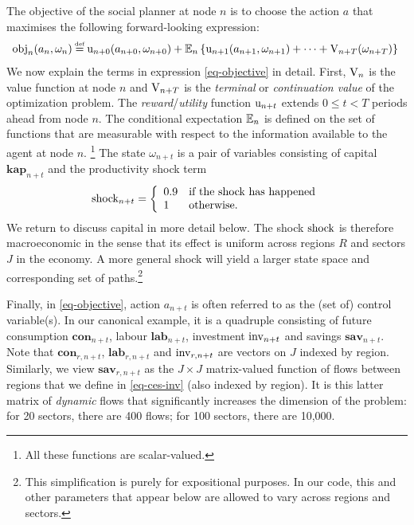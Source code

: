 \documentclass[12pt,a4paper,twoside, draft]{article}
\begin{document}
The objective of the social planner at node $n$ is to choose the action $a$
that maximises the following forward-looking expression:
\begin{align}\label{eq-objective}
\hskip-3pt   \textup{obj}_{n}(a_{n}, \omega_{n}) \defeq
   \textup{u}_{n + 0}(a_{n + 0}, \omega_{n + 0})
    + \mbb{E}_{n}\left\{
      \textup{u}_{n + 1}(a_{n + 1}, \omega_{n + 1}) + \cdots
      + \textup{V}_{n + T}(\omega_{n + T})
    \right\}
\end{align}
We now explain the terms in expression \eqref{eq-objective} in detail.
First, $\textup{V}_{n}$ is the value function at node $n$ and
$\textup{V}_{n + T}$ is the \emph{terminal} or \emph{continuation value} of the
optimization problem.
The \emph{reward}/\emph{utility} function $\textup{u}_{n + t}$ extends
$0 \leq t < T$ periods ahead from node $n$.
The conditional expectation $\mathbb{E}_{n}$ is defined on the set of functions
that are measurable with respect to the information available to the agent at 
node $n$.
\footnote{
   All these functions are scalar-valued.
}
The state $\omega_{n + t} $ is a pair of variables consisting  of capital
$\mathbf{kap}_{n + t}$ and the productivity shock term
\begin{equation}
   \textup{shock}_{n + t} = \left\{
      \begin{array}{ll}
         0.9 & \textup{if the shock has happened}\\
         1 & \textup{otherwise.}
      \end{array}\right.
\end{equation}
We return to discuss capital in more detail below.
The shock $\textup{shock}$ is therefore macroeconomic in the sense that
its effect is uniform across regions $R$ and sectors $J$ in the economy.
A more general shock will yield a larger state space and corresponding set of
paths.\footnote{
   This simplification is purely for expositional purposes.
   In our code, this and other parameters that appear below are allowed to vary 
   across regions and sectors.
}

Finally, in \eqref{eq-objective}, action $a_{n + t}$ is often referred to as
the (set of) control variable(s).
In our canonical example, it is a quadruple consisting of future consumption
$\mathbf{con}_{n + t}$, labour $\mathbf{lab}_{n + t}$, investment
$\textup{inv}_{n + t}$ and savings $\mathbf{sav}_{n + t}$.
Note that $\mathbf{con}_{r, n + t}$, $\mathbf{lab}_{r, n + t}$ and
$\textup{inv}_{r, n + t}$ are vectors on $J$ indexed by region.
Similarly, we view $\mathbf{sav}_{r, n + t}$ as the $J\times J$ matrix-valued
function of flows between regions that we define in \eqref{eq-ces-inv} (also
indexed by region).
It is this latter matrix of \emph{dynamic} flows that significantly increases
the dimension of the problem: for 20 sectors, there are 400 flows; for 100
sectors, there are 10,000.
\end{document}
